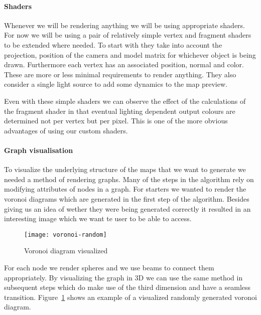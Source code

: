 \paragraph{Shaders}

Whenever we will be rendering anything we will be using appropriate shaders. For now we will be using a pair of relatively simple vertex and fragment shaders to be extended where needed. To start with they take into account the projection, position of the camera and model matrix for whichever object is being drawn. Furthermore each vertex has an associated position, normal and color. These are more or less minimal requirements to render anything. They also consider a single light source to add some dynamics to the map preview. 

Even with these simple shaders we can observe the effect of the calculations of the fragment shader in that eventual lighting dependent output colours are determined not per vertex but per pixel. This is one of the more obvious advantages of using our custom shaders.

\paragraph{Graph visualisation}

To visualize the underlying structure of the maps that we want to generate we needed a method of rendering graphs. Many of the steps in the algorithm rely on modifying attributes of nodes in a graph. For starters we wanted to render the voronoi diagrams which are generated in the first step of the algorithm. Besides giving us an idea of wether they were being generated correctly it resulted in an interesting image which we want te user to be able to access.

\begin{figure}[h]
	\centering
	\texttt{[image: voronoi-random]}
	\caption{Voronoi diagram visualized}
	\label{fig:voronoi-random}
\end{figure}

For each node we render spheres and we use beams to connect them appropriately. By visualizing the graph in 3D we can use the same method in subsequent steps which do make use of the third dimension and have a seamless transition. Figure~\ref{fig:voronoi-random} shows an example of a visualized randomly generated voronoi diagram.

